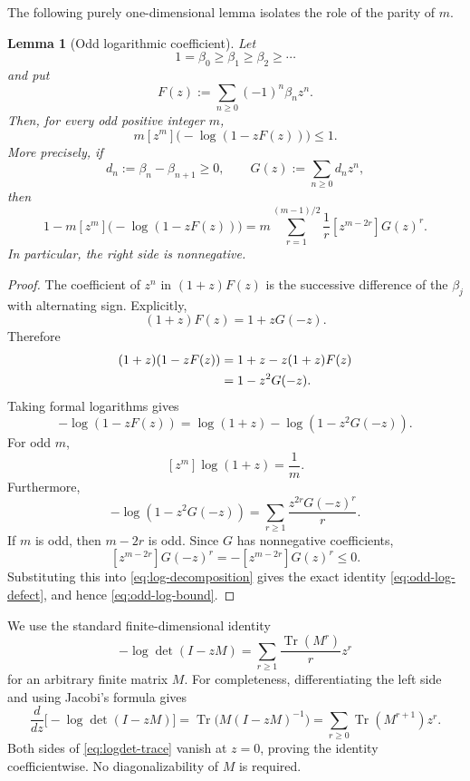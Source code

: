 \documentclass[11pt]{article}
\newtheorem{lemma}[theorem]{Lemma}
\newcommand{\Tr}{\operatorname{Tr}}
\begin{document}
The following purely one-dimensional lemma isolates the role of the
parity of $m$.

\begin{lemma}[Odd logarithmic coefficient]
\label{lem:odd-log}
Let
\[
  1=\beta_0\ge\beta_1\ge\beta_2\ge\cdots
\]
and put
\[
  F(z):=\sum_{n\ge0}(-1)^n\beta_nz^n.
\]
Then, for every odd positive integer $m$,
\begin{equation}
  m[z^m]\bigl(-\log(1-zF(z))\bigr)\le1.
  \label{eq:odd-log-bound}
\end{equation}
More precisely, if
\[
  d_n:=\beta_n-\beta_{n+1}\ge0,
  \qquad
  G(z):=\sum_{n\ge0}d_nz^n,
\]
then
\begin{equation}
  1-m[z^m]\bigl(-\log(1-zF(z))\bigr)
  =
  m\sum_{r=1}^{(m-1)/2}\frac1r
  [z^{m-2r}]G(z)^r.
  \label{eq:odd-log-defect}
\end{equation}
In particular, the right side is nonnegative.
\end{lemma}

\begin{proof}
The coefficient of $z^n$ in $(1+z)F(z)$ is the successive difference
of the $\beta_j$ with alternating sign.  Explicitly,
\begin{equation}
  (1+z)F(z)=1+zG(-z).
  \label{eq:F-G}
\end{equation}
Therefore
\begin{align}
  (1+z)(1-zF(z))
  &=1+z-z(1+z)F(z)\notag\\
  &=1-z^2G(-z).
  \label{eq:factor-log}
\end{align}
Taking formal logarithms gives
\begin{equation}
  -\log(1-zF(z))
  =
  \log(1+z)-\log(1-z^2G(-z)).
  \label{eq:log-decomposition}
\end{equation}
For odd $m$,
\[
  [z^m]\log(1+z)=\frac1m.
\]
Furthermore,
\begin{equation}
  -\log(1-z^2G(-z))
  =
  \sum_{r\ge1}\frac{z^{2r}G(-z)^r}{r}.
  \label{eq:log-G-expansion}
\end{equation}
If $m$ is odd, then $m-2r$ is odd.  Since $G$ has nonnegative
coefficients,
\[
  [z^{m-2r}]G(-z)^r
  =-[z^{m-2r}]G(z)^r\le0.
\]
Substituting this into \eqref{eq:log-decomposition} gives the exact
identity \eqref{eq:odd-log-defect}, and hence
\eqref{eq:odd-log-bound}.
\end{proof}

We use the standard finite-dimensional identity
\begin{equation}
  -\log\det(I-zM)
  =
  \sum_{r\ge1}\frac{\Tr(M^r)}{r}z^r
  \label{eq:logdet-trace}
\end{equation}
for an arbitrary finite matrix $M$.  For completeness, differentiating
the left side and using Jacobi's formula gives
\[
  \frac{d}{dz}\bigl[-\log\det(I-zM)\bigr]
  =\Tr\bigl(M(I-zM)^{-1}\bigr)
  =\sum_{r\ge0}\Tr(M^{r+1})z^r.
\]
Both sides of \eqref{eq:logdet-trace} vanish at $z=0$, proving the
identity coefficientwise.  No diagonalizability of $M$ is required.
\end{document}
